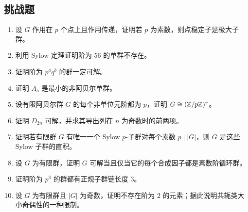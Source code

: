 \subsection*{挑战题}
\begin{enumerate}[resume, label=\textbf{\arabic*.}, leftmargin=*, itemsep=0.5em]
\item \hard 设 $G$ 作用在 $p$ 个点上且作用传递，证明若 $p$ 为素数，则点稳定子是极大子群。
\item \hard 利用 Sylow 定理证明阶为 $56$ 的单群不存在。
\item \hard 证明阶为 $p^aq^b$ 的群一定可解。
\item \hard 证明 $A_5$ 是最小的非阿贝尔单群。
\item \hard 设有限阿贝尔群 $G$ 的每个非单位元阶都为 $p$，证明 $G\cong (\mathbb{Z}/p\mathbb{Z})^r$。
\item \hard 证明 $D_{2n}$ 可解，并求其导出列在 $n$ 为奇数时的前两项。
\item \hard 证明若有限群 $G$ 有唯一一个 Sylow $p$-子群对每个素数 $p\mid|G|$，则 $G$ 是这些 Sylow 子群的直积。
\item \hard 设 $G$ 为有限群，证明 $G$ 可解当且仅当它的每个合成因子都是素数阶循环群。
\item \hard 证明阶为 $p^3$ 的群都有正规子群链长度 $3$。
\item \hard 设 $G$ 为有限群且 $|G|$ 为奇数，证明不存在阶为 $2$ 的元素；据此说明共轭类大小奇偶性的一种限制。
\end{enumerate}
